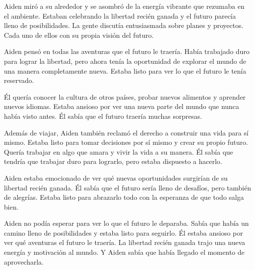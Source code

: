 

Aiden miró a su alrededor y se asombró de la energía vibrante que rezumaba en el ambiente. Estaban celebrando la libertad recién ganada y el futuro parecía lleno de posibilidades. La gente discutía entusiasmada sobre planes y proyectos. Cada uno de ellos con su propia visión del futuro.

Aiden pensó en todas las aventuras que el futuro le traería. Había trabajado duro para lograr la libertad, pero ahora tenía la oportunidad de explorar el mundo de una manera completamente nueva. Estaba listo para ver lo que el futuro le tenía reservado.

Él quería conocer la cultura de otros países, probar nuevos alimentos y aprender nuevos idiomas. Estaba ansioso por ver una nueva parte del mundo que nunca había visto antes. Él sabía que el futuro traería muchas sorpresas.

Además de viajar, Aiden también reclamó el derecho a construir una vida para sí mismo. Estaba listo para tomar decisiones por sí mismo y crear su propio futuro. Quería trabajar en algo que amara y vivir la vida a su manera. Él sabía que tendría que trabajar duro para lograrlo, pero estaba dispuesto a hacerlo.

Aiden estaba emocionado de ver qué nuevas oportunidades surgirían de su libertad recién ganada. Él sabía que el futuro sería lleno de desafíos, pero también de alegrías. Estaba listo para abrazarlo todo con la esperanza de que todo salga bien.

Aiden no podía esperar para ver lo que el futuro le deparaba. Sabía que había un camino lleno de posibilidades y estaba listo para seguirlo. Él estaba ansioso por ver qué aventuras el futuro le traería. La libertad recién ganada trajo una nueva energía y motivación al mundo. Y Aiden sabía que había llegado el momento de aprovecharla.